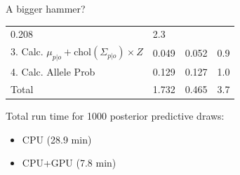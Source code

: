 \documentclass[11pt,ignorenonframetext,]{beamer}
\providecommand{\tightlist}{%
  \setlength{\itemsep}{0pt}\setlength{\parskip}{0pt}}
\begin{document}
\begin{frame}{A bigger hammer?}
\begin{longtable}[]{@{}llll@{}}
\begin{minipage}[t]{0.19\columnwidth}
0.208\strut
\end{minipage} & \begin{minipage}[t]{0.13\columnwidth}\raggedright
2.3\strut
\end{minipage}\tabularnewline
\begin{minipage}[t]{0.41\columnwidth}\raggedright
3. Calc. \(\mu_{p|o} + \text{chol}(\Sigma_{p|o}) \times Z\)\strut
\end{minipage} & \begin{minipage}[t]{0.15\columnwidth}\raggedright
0.049\strut
\end{minipage} & \begin{minipage}[t]{0.19\columnwidth}\raggedright
0.052\strut
\end{minipage} & \begin{minipage}[t]{0.13\columnwidth}\raggedright
0.9\strut
\end{minipage}\tabularnewline
\begin{minipage}[t]{0.41\columnwidth}\raggedright
4. Calc. Allele Prob\strut
\end{minipage} & \begin{minipage}[t]{0.15\columnwidth}\raggedright
0.129\strut
\end{minipage} & \begin{minipage}[t]{0.19\columnwidth}\raggedright
0.127\strut
\end{minipage} & \begin{minipage}[t]{0.13\columnwidth}\raggedright
1.0\strut
\end{minipage}\tabularnewline
\begin{minipage}[t]{0.41\columnwidth}\raggedright
Total\strut
\end{minipage} & \begin{minipage}[t]{0.15\columnwidth}\raggedright
1.732\strut
\end{minipage} & \begin{minipage}[t]{0.19\columnwidth}\raggedright
0.465\strut
\end{minipage} & \begin{minipage}[t]{0.13\columnwidth}\raggedright
3.7\strut
\end{minipage}\tabularnewline
\bottomrule
\end{longtable}

\normalsize

Total run time for 1000 posterior predictive draws:

\begin{itemize}
\tightlist
\item
  CPU (28.9 min)
\item
  CPU+GPU (7.8 min)
\end{itemize}

\end{frame}
\end{document}
